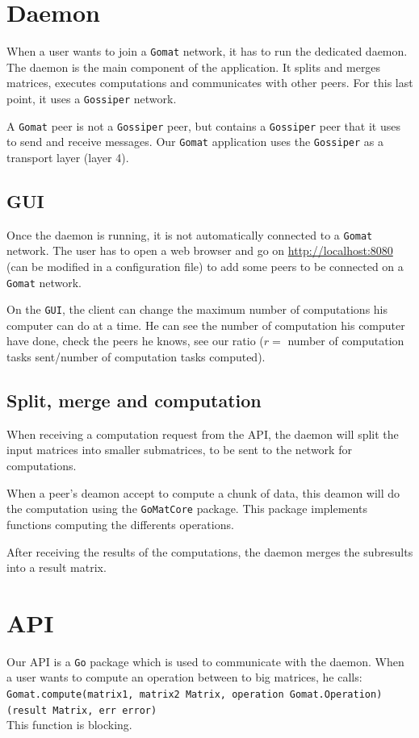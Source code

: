 \documentclass[a4paper,12pt]{article}
\newcommand{\Gossiper}{\texttt{Gossiper}\xspace}
\newcommand{\Gomat}{\texttt{Gomat}\xspace}
\newcommand{\Go}{\texttt{Go}\xspace}
\begin{document}
    \section{Daemon}
    When a user wants to join a \Gomat network, it has to run the dedicated daemon. The daemon is the main component of the application. It splits and merges matrices, executes computations and communicates with other peers. For this last point, it uses a \Gossiper network.

    A \Gomat peer is not a \Gossiper peer, but contains a \Gossiper peer that it uses to send and receive messages. Our \Gomat application uses the \Gossiper as a transport layer (layer 4).

    \subsection{GUI}
    Once the daemon is running, it is not automatically connected to a \Gomat network. The user has to open a web browser and go on \url{http://localhost:8080} (can be modified in a configuration file) to add some peers to be connected on a
    \Gomat network.

    On the \texttt{GUI}, the client can change the maximum number of computations his computer can do at a time. He can see
    the number of computation his computer have done, check the peers he knows, see our ratio
    ($r =$ number of computation tasks sent/{number of computation tasks computed}).

    \subsection{Split, merge and computation}
    When receiving a computation request from the API, the daemon will split the input matrices into smaller submatrices, to be sent to the network for computations.

    When a peer's deamon accept to compute a chunk of data, this deamon will do the computation using the \texttt{GoMatCore} package. This package implements functions computing the differents operations.

    After receiving the results of the computations, the daemon merges the subresults into a result matrix.

    \section{API}
    Our API is a \Go package which is used to communicate with the daemon. When a user wants to compute an operation between to big matrices, he calls:\\
    \texttt{Gomat.compute(matrix1, matrix2 Matrix, operation Gomat.Operation)(result Matrix, err error)}\\
    This function is blocking.
\end{document}
